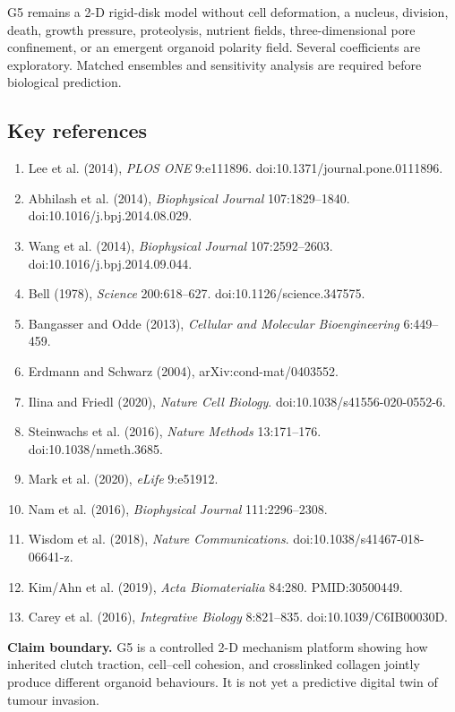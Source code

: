 \documentclass[10.5pt]{article}
\begin{document}
G5 remains a 2-D rigid-disk model without cell deformation, a nucleus, division, death, growth
pressure, proteolysis, nutrient fields, three-dimensional pore confinement, or an emergent
organoid polarity field. Several coefficients are exploratory. Matched ensembles and sensitivity
analysis are required before biological prediction.

\subsection*{Key references}
\begin{enumerate}[leftmargin=1.5em,itemsep=2pt]
\item Lee et al. (2014), \emph{PLOS ONE} 9:e111896. doi:10.1371/journal.pone.0111896.
\item Abhilash et al. (2014), \emph{Biophysical Journal} 107:1829--1840. doi:10.1016/j.bpj.2014.08.029.
\item Wang et al. (2014), \emph{Biophysical Journal} 107:2592--2603. doi:10.1016/j.bpj.2014.09.044.
\item Bell (1978), \emph{Science} 200:618--627. doi:10.1126/science.347575.
\item Bangasser and Odde (2013), \emph{Cellular and Molecular Bioengineering} 6:449--459.
\item Erdmann and Schwarz (2004), arXiv:cond-mat/0403552.
\item Ilina and Friedl (2020), \emph{Nature Cell Biology}. doi:10.1038/s41556-020-0552-6.
\item Steinwachs et al. (2016), \emph{Nature Methods} 13:171--176. doi:10.1038/nmeth.3685.
\item Mark et al. (2020), \emph{eLife} 9:e51912.
\item Nam et al. (2016), \emph{Biophysical Journal} 111:2296--2308.
\item Wisdom et al. (2018), \emph{Nature Communications}. doi:10.1038/s41467-018-06641-z.
\item Kim/Ahn et al. (2019), \emph{Acta Biomaterialia} 84:280. PMID:30500449.
\item Carey et al. (2016), \emph{Integrative Biology} 8:821--835. doi:10.1039/C6IB00030D.
\end{enumerate}

\medskip
\noindent\textbf{Claim boundary.} G5 is a controlled 2-D mechanism platform showing how
inherited clutch traction, cell--cell cohesion, and crosslinked collagen jointly produce
different organoid behaviours. It is not yet a predictive digital twin of tumour invasion.
\end{document}
